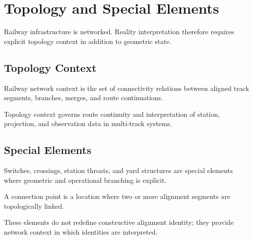 
\chapter{Topology and Special Elements}

\label{chap:topology-and-special-elements}


Railway infrastructure is networked. Reality interpretation therefore
requires explicit topology context in addition to geometric state.

\section{Topology Context}

\begin{definition}
Railway network context is the set of connectivity relations between
aligned track segments, branches, merges, and route continuations.
\end{definition}

Topology context governs route continuity and interpretation of station,
projection, and observation data in multi-track systems.

\section{Special Elements}

Switches, crossings, station throats, and yard structures are special
elements where geometric and operational branching is explicit.

\begin{definition}
A connection point is a location where two or more alignment segments
are topologically linked.
\end{definition}

These elements do not redefine constructive alignment identity; they
provide network context in which identities are interpreted.

